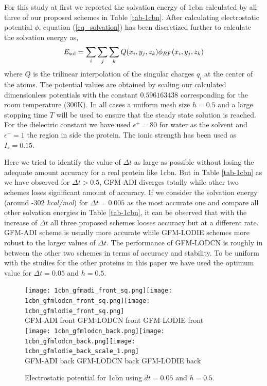   For this study at first we reported the solvation energy of 1cbn calculated by all three of our proposed schemes in Table \ref{tab-1cbn}. After calculating electrostatic potential $\phi$, equation (\ref{eq_solvation}) has been discretized further to calculate the solvation energy as, 
 \begin{equation}
 	E_{\rm sol} = \sum_i \sum_j \sum_k Q({x_i,y_j,z_k}) \phi_{RF}(x_i,y_j,z_k)
 \end{equation} 
where $Q$ is the trilinear interpolation of the singular charges $q_i$ at the center of the atoms.  The potential values are obtained by scaling our calculated dimensionless potentials with the constant $0.596163438$ corresponding for the room temperature (300K). In all cases a uniform mesh size $h = 0.5$ and a large stopping time $T$ will be used to ensure that the steady state solution is reached. For the dielectric constant we have used $\epsilon^+=80$ for water as the solvent and $\epsilon ^-=1$ the region in side the protein. The ionic strength has been used as $I_s = 0.15$.
 
Here we tried to identify the value of $\Delta t$ as large as possible without losing the adequate amount accuracy for a real protein like 1cbn. But in Table \ref{tab-1cbn} as we have observed  for $\Delta t > 0.5$, GFM-ADI diverges totally while other two schemes loses significant amount of accuracy. If we consider the solvation energy (around -302 {\it kcal/mol}) for $\Delta t =0.005$ as the most accurate one and compare all other solvation energies in Table \ref{tab-1cbn}, it can be observed that with the increase of $\Delta t$ all three proposed schemes looses accuracy but at a different rate. GFM-ADI scheme is usually more accurate while GFM-LODIE schemes more robust to the larger values of $\Delta t$. The performance of GFM-LODCN is roughly in between the other two schemes in terms of accuracy and stability. To be uniform  with the studies for the other proteins in this paper we have used the optimum value for $\Delta t =0.05$ and $h=0.5$. 
\begin{figure}[!ht]
\begin{center}	
	\texttt{[image: 1cbn\_gfmadi\_front\_sq.png]}\texttt{[image: 1cbn\_gfmlodcn\_front\_sq.png]}\texttt{[image: 1cbn\_gfmlodie\_front\_sq.png]}\\
GFM-ADI front \hskip 0.7in GFM-LODCN front \hskip 0.7in GFM-LODIE front\\
	\texttt{[image: 1cbn\_gfmlodcn\_back.png]}\texttt{[image: 1cbn\_gfmlodcn\_back.png]}\texttt{[image: 1cbn\_gfmlodie\_back\_scale\_1.png]}\\
  GFM-ADI back \hskip 0.7in GFM-LODCN back \hskip 0.7in GFM-LODIE back\\
	\caption{Electrostatic potential for 1cbn using $dt = 0.05$ and $h= 0.5$. }
\label{fig_1cbn}
\end{center}
\end{figure}

